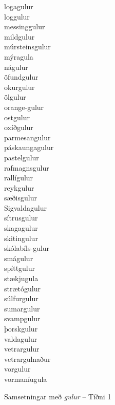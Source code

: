 \documentclass[../samsetningasafn.tex]{subfiles}
\begin{document}
\begin{bigwordlist}
\begin{footnotesize}
\begin{multicols}{4}
\begin{description}
		\item [logagulur]
		\item [loggulur]
		\item [messinggulur]
		\item [mildgulur]
		\item [múrsteinsgulur]
		\item [mýragula]
		\item [nágulur]
		\item [öfundgulur]
		\item [okurgulur]
		\item [ölgulur]
		\item [orange-gulur]
		\item [ostgulur]
		\item [oxíðgulur]
		\item [parmesangulur]
		\item [páskaungagulur]
		\item [pastelgulur]
		\item [rafmagnsgulur]
		\item [rallígulur]
		\item [reykgulur]
		\item [sæðisgulur]
		\item [Sigvaldagulur]
		\item [sítrusgulur]
		\item [skagagulur]
		\item [skitingulur]
		\item [skólabíls-gulur]
		\item [smágulur]
		\item [spíttgulur]
		\item [stækjugula]
		\item [strætógulur]
		\item [súlfurgulur]
		\item [sumargulur]
		\item [svampgulur]
		\item [þorskgulur]
		\item [valdagulur]
		\item [vetrargulur]
		\item [vetrargulnaður]
		\item [vorgulur]
		\item [vormaníugula]
	\end{description}
\end{multicols}
\end{footnotesize}

\label{listi:gul1}
\caption{Samsetningar með \textit{gulur} -- Tíðni 1}
\end{bigwordlist}
\end{document}
